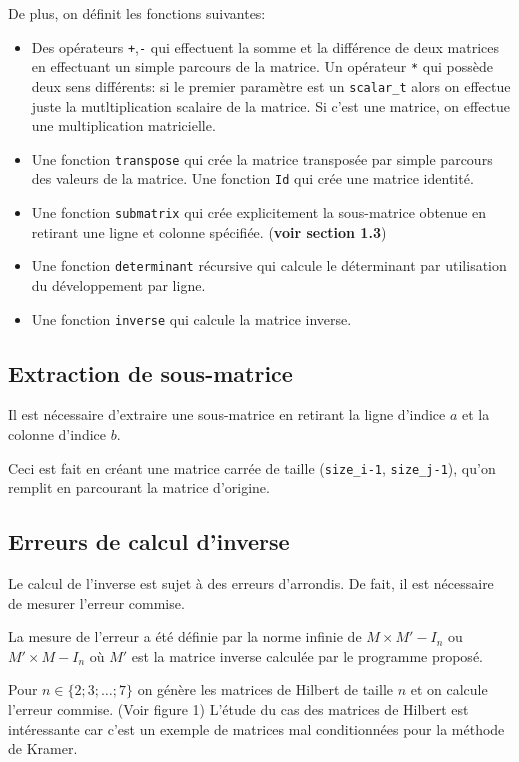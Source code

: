 \documentclass[a4paper,11pt]{article}
\begin{document}
De plus, on définit les fonctions suivantes:

\begin{itemize}
\item Des opérateurs \texttt{+},\texttt{-} qui effectuent la somme et la différence de deux matrices en effectuant un simple parcours de la matrice. Un opérateur \texttt{*} qui possède deux sens différents: si le premier paramètre est un \texttt{scalar\_t} alors on effectue juste la mutltiplication scalaire de la matrice. Si c'est une matrice, on effectue une multiplication matricielle.
\item Une fonction \texttt{transpose} qui crée la matrice transposée par simple parcours des valeurs de la matrice. Une fonction \texttt{Id} qui crée une matrice identité.
\item Une fonction \texttt{submatrix} qui crée explicitement la sous-matrice obtenue en retirant une ligne et colonne spécifiée. (\textbf{voir section 1.3})
\item Une fonction \texttt{determinant} récursive qui calcule le déterminant par utilisation du développement par ligne.
\item Une fonction \texttt{inverse} qui calcule la matrice inverse.
\end{itemize}

\subsection{Extraction de sous-matrice}

Il est nécessaire d'extraire une sous-matrice en retirant la ligne d'indice $a$ et la colonne d'indice $b$. 

Ceci est fait en créant une matrice carrée de taille (\texttt{size\_i-1}, \texttt{size\_j-1}), qu'on remplit en parcourant la matrice d'origine.

\subsection{Erreurs de calcul d'inverse}

Le calcul de l'inverse est sujet à des erreurs d'arrondis. De fait, il est nécessaire de mesurer l'erreur commise.

La mesure de l'erreur a été définie par la norme infinie de $M\times M' - I_n$ ou $M'\times M - I_n$ où $M'$ est la matrice inverse calculée par le programme proposé.

Pour $n \in \{2;3;\dots;7\}$ on génère les matrices de Hilbert de taille $n$ et on calcule l'erreur commise. (Voir figure 1) L'étude du cas des matrices de Hilbert est intéressante car c'est un exemple de matrices mal conditionnées pour la méthode de Kramer.
\end{document}

